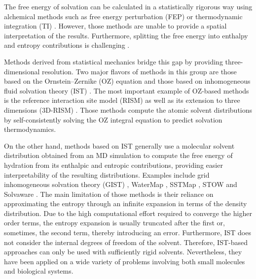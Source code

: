 \documentclass[9pt,tutorial]{livecoms}
\begin{document}
The free energy of solvation can be calculated in a statistically rigorous way using alchemical methods \cite{Liu2016-md-solubility,Mobley2009-dgsolv,Mobley2014-freesolv} such as free energy perturbation (FEP) \cite{Zwanzig1954-reweighting} or thermodynamic integration (TI) \cite{Kirkwood1935-ti}.
However, those methods are unable to provide a spatial interpretation of the results.
Furthermore, splitting the free energy into enthalpy and entropy contributions is challenging \cite{Peter2004-alchemical-entropy}.

Methods derived from statistical mechanics bridge this gap by providing three-dimensional resolution.
Two major flavors of methods in this group are those based on the Ornstein--Zernike (OZ) equation \cite{Hansen2013-simple-liquids} and those based on inhomogeneous fluid solvation theory (IST) \cite{Lazaridis1998}.
The most important example of OZ-based methods is the reference interaction site model (RISM) \cite{Chandler1972-rism} as well as its extension to three dimensions (3D-RISM) \cite{Kovalenko1998-3drism}.
Those methods compute the atomic solvent distributions by self-consistently solving the OZ integral equation to predict solvation thermodynamics.

On the other hand, methods based on IST generally use a molecular solvent distribution obtained from an MD simulation to compute the free energy of hydration from its enthalpic and entropic contributions, providing easier interpretability of the resulting distributions.
Examples include grid inhomogeneous solvation theory (GIST) \cite{Nguyen2012,Ramsey2016}, WaterMap \cite{Young2007-watermap,Abel2008-watermap}, SSTMap \cite{Haider2018-sstmap}, STOW \cite{Li2012-stow} and Solvaware \cite{Huggins2016-solvaware}.
The main limitation of those methods is their reliance on approximating the entropy through an infinite expansion in terms of the density distribution. 
Due to the high computational effort required to converge the higher order terms, the entropy expansion is usually truncated after the first or, sometimes, the second \cite{Nguyen2016-gist-second-order,Waibl2022-gist-solvents} term, thereby introducing an error.
Furthermore, IST does not consider the internal degrees of freedom of the solvent.
Therefore, IST-based approaches can only be used with sufficiently rigid solvents.
Nevertheless, they have been applied on a wide variety of problems involving both small molecules and biological systems.
\end{document}
